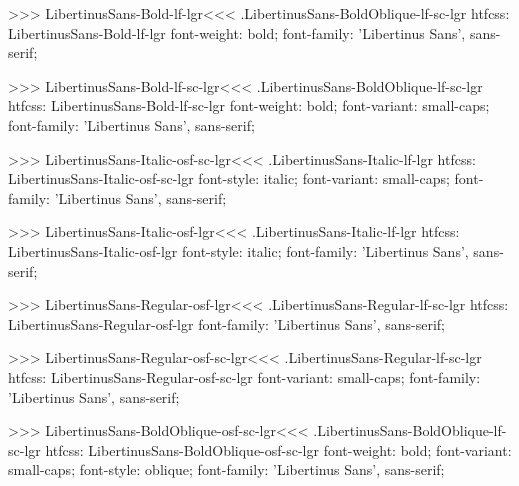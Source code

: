 >>>
\<LibertinusSans-Bold-lf-lgr\><<<
.LibertinusSans-BoldOblique-lf-sc-lgr
htfcss:  LibertinusSans-Bold-lf-lgr  font-weight: bold; font-family: 'Libertinus Sans', sans-serif;

>>>
\<LibertinusSans-Bold-lf-sc-lgr\><<<
.LibertinusSans-BoldOblique-lf-sc-lgr
htfcss:  LibertinusSans-Bold-lf-sc-lgr  font-weight: bold; font-variant: small-caps; font-family: 'Libertinus Sans', sans-serif;

>>>
\<LibertinusSans-Italic-osf-sc-lgr\><<<
.LibertinusSans-Italic-lf-lgr
htfcss:  LibertinusSans-Italic-osf-sc-lgr  font-style: italic; font-variant: small-caps; font-family: 'Libertinus Sans', sans-serif;

>>>
\<LibertinusSans-Italic-osf-lgr\><<<
.LibertinusSans-Italic-lf-lgr
htfcss:  LibertinusSans-Italic-osf-lgr  font-style: italic; font-family: 'Libertinus Sans', sans-serif;

>>>
\<LibertinusSans-Regular-osf-lgr\><<<
.LibertinusSans-Regular-lf-sc-lgr
htfcss:  LibertinusSans-Regular-osf-lgr  font-family: 'Libertinus Sans', sans-serif;

>>>
\<LibertinusSans-Regular-osf-sc-lgr\><<<
.LibertinusSans-Regular-lf-sc-lgr
htfcss:  LibertinusSans-Regular-osf-sc-lgr  font-variant: small-caps; font-family: 'Libertinus Sans', sans-serif;

>>>
\<LibertinusSans-BoldOblique-osf-sc-lgr\><<<
.LibertinusSans-BoldOblique-lf-sc-lgr
htfcss:  LibertinusSans-BoldOblique-osf-sc-lgr  font-weight: bold; font-variant: small-caps; font-style: oblique; font-family: 'Libertinus Sans', sans-serif;

